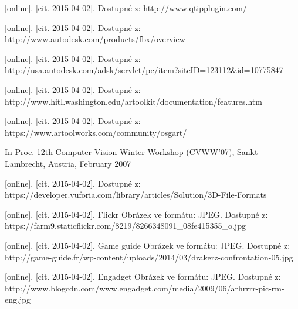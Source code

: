 \documentclass[twoside,12pt]{article}
\begin{document}
\begin{literatura}
{
	 [online]. [cit. 2015-04-02]. Dostupné z: http://www.qtipplugin.com/
}

{
	 [online]. [cit. 2015-04-02]. Dostupné z: http://www.autodesk.com/products/fbx/overview
}

{
	 [online]. [cit. 2015-04-02]. Dostupné z: http://usa.autodesk.com/adsk/servlet/pc/item?siteID=123112\&id=10775847
}

{
	 [online]. [cit. 2015-04-02]. Dostupné z: http://www.hitl.washington.edu/artoolkit/documentation/features.htm
}

{
	 [online]. [cit. 2015-04-02]. Dostupné z: https://www.artoolworks.com/community/osgart/
}

{
In Proc. 12th Computer Vision Winter Workshop (CVWW'07), Sankt Lambrecht, Austria, February 2007
}

{
	 [online]. [cit. 2015-04-02]. Dostupné z: https://developer.vuforia.com/library/articles/Solution/3D-File-Formats
}





{
	[online]. [cit. 2015-04-02]. Flickr
	Obrázek ve formátu: JPEG. Dostupné z: https://farm9.staticflickr.com/8219/8266348091\_08fe415355\_o.jpg
}

{
	[online]. [cit. 2015-04-02]. Game guide
	Obrázek ve formátu: JPEG. Dostupné z: http://game-guide.fr/wp-content/uploads/2014/03/drakerz-confrontation-05.jpg
}

{
	[online]. [cit. 2015-04-02]. Engadget
	Obrázek ve formátu: JPEG. Dostupné z: http://www.blogcdn.com/www.engadget.com/media/2009/06/arhrrrr-pic-rm-eng.jpg
}


\end{literatura}
\end{document}

